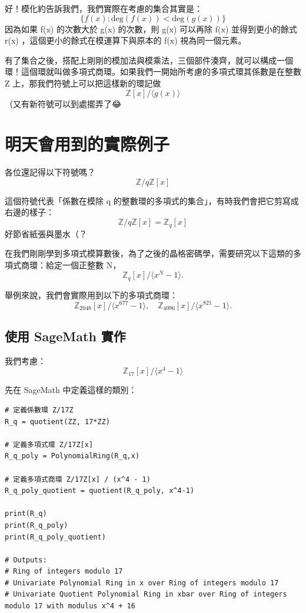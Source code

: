 \documentclass[
]{article}
\begin{document}
好！模化約告訴我們，我們實際在考慮的集合其實是： \[
\{
f(x):\mathrm{deg} (f(x))<\mathrm{deg} (g(x))
\}
\] 因為如果 f(x) 的次數大於 g(x) 的次數，則 g(x) 可以再除 f(x)
並得到更小的餘式 r(x) ，這個更小的餘式在模運算下與原本的 f(x)
視為同一個元素。

有了集合之後，搭配上剛剛的模加法與模乘法，三個部件湊齊，就可以構成一個環！這個環就叫做多項式商環。如果我們一開始所考慮的多項式環其係數是在整數
Z 上，那我們符號上可以把這樣新的環記做 \[
\mathbb{Z}[x] / \langle g(x)\rangle
\] （又有新符號可以到處擺弄了😂

\hypertarget{ux660eux5929ux6703ux7528ux5230ux7684ux5be6ux969bux4f8bux5b50}{%
\section{明天會用到的實際例子}\label{ux660eux5929ux6703ux7528ux5230ux7684ux5be6ux969bux4f8bux5b50}}

各位還記得以下符號嗎？ \[
\mathbb{Z} / q\mathbb{Z} [x]
\]

這個符號代表「係數在模除 q
的整數環的多項式的集合」，有時我們會把它剪寫成右邊的樣子： \[
\mathbb{Z} / q\mathbb{Z}[x] = \mathbb{Z}_{q }[x]
\] 好節省紙張與墨水（？

在我們剛剛學到多項式模算數後，為了之後的晶格密碼學，需要研究以下這類的多項式商環：給定一個正整數
N， \[
\mathbb{Z}_{q}[x] / \langle x^N-1\rangle.
\]

舉例來說，我們會實際用到以下的多項式商環： \[
\mathbb{Z}_{2048}[x] / \langle x^{677}-1\rangle,\quad
\mathbb{Z}_{4096}[x] / \langle x^{821}-1\rangle.
\]

\hypertarget{ux4f7fux7528-sagemath-ux5be6ux4f5c}{%
\subsection{使用 SageMath
實作}\label{ux4f7fux7528-sagemath-ux5be6ux4f5c}}

我們考慮： \[
\mathbb{Z}_{17}[x] / \langle x^4-1 \rangle
\]

先在 SageMath 中定義這樣的類別：

\begin{verbatim}
# 定義係數環 Z/17Z
R_q = quotient(ZZ, 17*ZZ)

# 定義多項式環 Z/17Z[x]
R_q_poly = PolynomialRing(R_q,x)

# 定義多項式商環 Z/17Z[x] / (x^4 - 1)
R_q_poly_quotient = quotient(R_q_poly, x^4-1)

print(R_q)
print(R_q_poly)
print(R_q_poly_quotient)

# Outputs:
# Ring of integers modulo 17
# Univariate Polynomial Ring in x over Ring of integers modulo 17
# Univariate Quotient Polynomial Ring in xbar over Ring of integers modulo 17 with modulus x^4 + 16
\end{verbatim}
\end{document}
